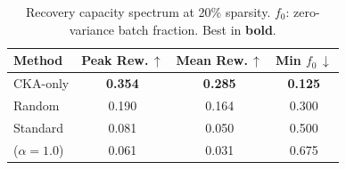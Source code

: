 \begin{table}[t]
\centering
\small
\caption{Recovery capacity spectrum at 20\% sparsity. $f_0$: zero-variance batch fraction. Best in \textbf{bold}.}
\label{tab:recovery_gradient}
\setlength{\tabcolsep}{5pt}
\begin{tabular}{@{}lccc@{}}
\toprule
Method & Peak Rew.\,$\uparrow$ & Mean Rew.\,$\uparrow$ & Min $f_0$\,$\downarrow$ \\
\midrule
CKA-only & \textbf{0.354} & \textbf{0.285} & \textbf{0.125} \\
Random & 0.190 & 0.164 & 0.300 \\
Standard & 0.081 & 0.050 & 0.500 \\
\rasp{} ($\alpha{=}1.0$) & 0.061 & 0.031 & 0.675 \\
\bottomrule
\end{tabular}
\end{table}
